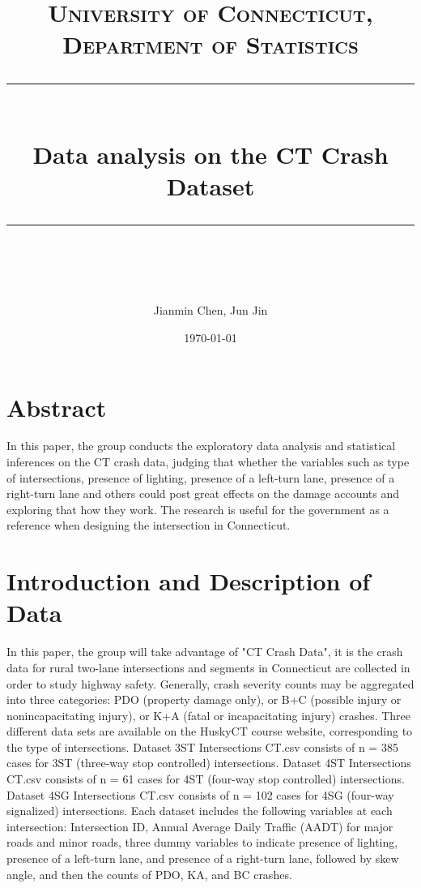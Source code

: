 \documentclass[11pt]{scrartcl} %
\title{	
	\normalfont\normalsize
	\textsc{University of Connecticut, Department of Statistics}\\ %
	\vspace{25pt} %
	\rule{\linewidth}{0.5pt}\\ %
	\vspace{20pt} %
	{\huge Data analysis on the CT Crash Dataset}\\ %
	\vspace{12pt} %
	\rule{\linewidth}{2pt}\\ %
	\vspace{12pt} %
}
\author{\LARGE Jianmin Chen, Jun Jin} %
\date{\normalsize\today} %
\begin{document}
\maketitle %


\tableofcontents


\section{Abstract}

In this paper, the group conducts the exploratory data analysis and statistical inferences on the CT crash data, judging that whether the variables such as type of intersections, presence of lighting, presence of a left-turn lane, presence of a right-turn lane and others could post great effects on the damage accounts and exploring that how they work. The research is useful for the government as a reference when designing the intersection in Connecticut.


\section{Introduction and Description of Data}

In this paper, the group will take advantage of "CT Crash Data", it is the crash data for rural two-lane intersections and segments in Connecticut are collected in order to study highway safety. Generally, crash severity counts may be aggregated into three categories: PDO (property damage only), or B+C (possible injury or nonincapacitating injury), or K+A (fatal or incapacitating injury) crashes. Three different data sets are available on the HuskyCT course website, corresponding to the type of intersections. Dataset 3ST Intersections CT.csv consists of n = 385 cases for 3ST (three-way stop controlled) intersections.
Dataset 4ST Intersections CT.csv consists of n = 61 cases for 4ST (four-way stop controlled) intersections. Dataset 4SG Intersections CT.csv consists of n = 102 cases for 4SG (four-way signalized) intersections. Each dataset includes the following variables at each intersection: Intersection ID, Annual Average Daily Traffic (AADT) for major roads and minor roads, three dummy variables to indicate presence of lighting, presence of a left-turn lane, and presence of a right-turn lane, followed by skew angle, and then the counts of PDO, KA, and BC crashes.
\end{document}
